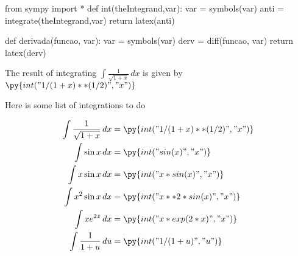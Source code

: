 \documentclass[11pt]{article}%
\begin{document}
	
	
	\begin{pycode}
from sympy import *
def int(theIntegrand,var):
	var  = symbols(var)
	anti = integrate(theIntegrand,var)
	return latex(anti)

def derivada(funcao, var):
	var = symbols(var)
	derv = diff(funcao, var)
	return latex(derv)
	\end{pycode}
	
	The result of integrating $\int \frac{1}{\sqrt{ 1+x }} \, dx$ is given by $\py{int("1/(1+x)**(1/2)","x")}$
	
	Here is some list of integrations to do 
	
	\begin{align*} 
		\int \frac{1}{\sqrt{ 1+x }} \, dx &=  \py{int("1/(1+x)**(1/2)","x")} \\
		\int \sin x \, dx &=  \py{int("sin(x)","x")} \\
		\int x \sin x \, dx &=  \py{int("x*sin(x)","x")} \\
		\int x^2 \sin x \, dx &=  \py{int("x**2 * sin(x)","x")} \\
		\int x e^{2 x} \, dx &=  \py{int("x*exp(2*x)","x")} \\
		\int \frac{1}{1+u} \, du &=  \py{int("1/(1+u)","u")} \\
	\end{align*} 
	
\end{document}
